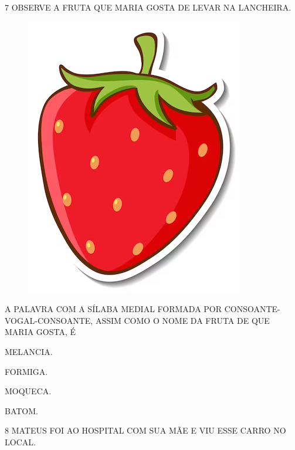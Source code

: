 \num{7} OBSERVE A FRUTA QUE MARIA GOSTA DE LEVAR NA LANCHEIRA.

\begin{figure}[H]
\centering
\includegraphics[width=\textwidth]{./media/image74.png}
\end{figure}

A PALAVRA COM A SÍLABA MEDIAL FORMADA POR CONSOANTE-VOGAL-CONSOANTE, ASSIM COMO O NOME DA FRUTA DE QUE MARIA GOSTA, É 

\begin{escolha}

\item MELANCIA.

\item FORMIGA.

\item MOQUECA.

\item BATOM.

\end{escolha}

\num{8} MATEUS FOI AO HOSPITAL COM SUA MÃE E VIU ESSE CARRO NO LOCAL.

